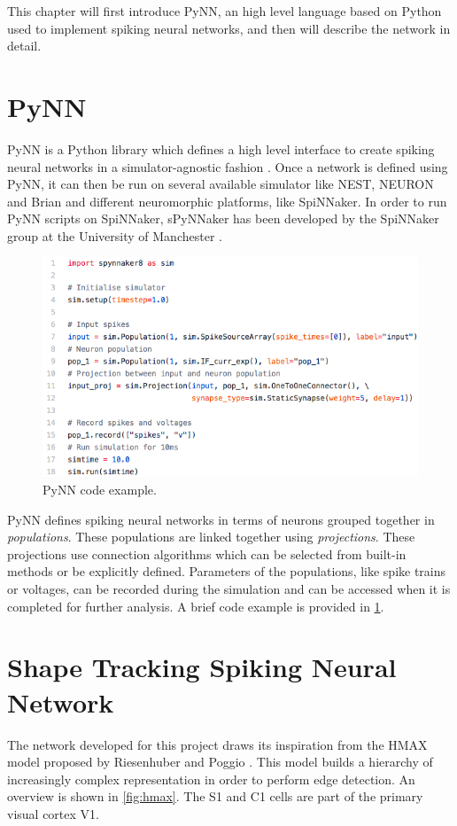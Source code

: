 This chapter will first introduce PyNN, an high level language based on Python used to implement spiking neural networks, and then will describe the network in detail.

\section{PyNN}
PyNN is a Python library which defines a high level interface to create spiking neural networks in a simulator-agnostic fashion \cite{Davison2008}. Once a network is defined using PyNN, it can then be run on several available simulator like NEST, NEURON and Brian and different neuromorphic platforms, like SpiNNaker. In order to run PyNN scripts on SpiNNaker, sPyNNaker has been developed by the SpiNNaker group at the University of Manchester \cite{Rhodes2018}.

\begin{figure}[ht]
\centering
\includegraphics[scale=0.5]{images/development/pynn_example.png}
\caption[PyNN Example]{PyNN code example.}
\label{fig:pynn_example}
\end{figure}

PyNN defines spiking neural networks in terms of neurons grouped together in \emph{populations}. These populations are linked together using \emph{projections}. These projections use connection algorithms which can be selected from built-in methods or be explicitly defined. Parameters of the populations, like spike trains or voltages, can be recorded during the simulation and can be accessed when it is completed for further analysis. A brief code example is provided in \cref{fig:pynn_example}. 

\section{Shape Tracking Spiking Neural Network}
The network developed for this project draws its inspiration from the HMAX model proposed by Riesenhuber and Poggio \cite{Riesenhuber1999}. This model builds a hierarchy of increasingly complex representation in order to perform edge detection. An overview is shown in \cref{fig:hmax}. The \textsc{S1} and \textsc{C1} cells are part of the primary visual cortex V1.  

